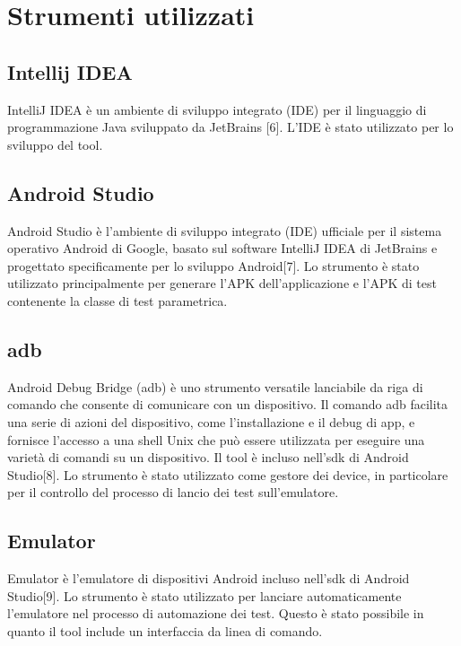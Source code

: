 \newpage
\section*{Strumenti utilizzati}

\label{cap:strumenti}
\subsection*{Intellij IDEA}
IntelliJ IDEA è un ambiente di sviluppo integrato (IDE) per il linguaggio di programmazione Java sviluppato da JetBrains [6]. L'IDE è stato utilizzato per lo sviluppo del tool.

\subsection*{Android Studio}
Android Studio è l'ambiente di sviluppo integrato (IDE) ufficiale per il sistema operativo Android di Google, basato sul software IntelliJ IDEA di JetBrains e progettato specificamente per lo sviluppo Android[7]. Lo strumento è stato utilizzato principalmente per generare l'APK dell'applicazione e l'APK di test contenente la classe di test parametrica.  

\subsection*{adb}
Android Debug Bridge (adb) è uno strumento versatile lanciabile da riga di comando che consente di comunicare con un dispositivo. Il comando adb facilita una serie di azioni del dispositivo, come l'installazione e il debug di app, e fornisce l'accesso a una shell Unix che può essere utilizzata per eseguire una varietà di comandi su un dispositivo. Il tool è incluso nell'sdk di Android Studio[8]. Lo strumento è stato utilizzato come gestore dei device, in particolare per il controllo del processo di lancio dei test sull'emulatore.

\subsection*{Emulator}
Emulator è l'emulatore di dispositivi Android incluso nell'sdk di Android Studio[9]. Lo strumento è stato utilizzato per lanciare automaticamente l'emulatore nel processo di automazione dei test. Questo è stato possibile in quanto il tool include un interfaccia da linea di comando. 

